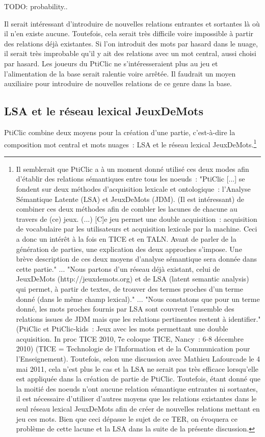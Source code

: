 \documentclass[a4paper,11pt,french]{article}
\begin{document}
TODO: probability..

Il serait intéressant d'introduire de nouvelles relations entrantes et sortantes là où il n'en existe aucune. Toutefois, cela serait très difficile voire impossible à partir des relations déjà existantes. Si l'on introduit des mots par hasard dans le nuage, il serait très improbable qu'il y ait des relations avec un mot central, aussi choisi par hasard. Les joueurs du PtiClic ne s'intéresseraient plus au jeu et l'alimentation de la base serait ralentie voire arrêtée. Il faudrait un moyen auxiliaire pour introduire de nouvelles relations de ce genre dans la base.  

\subsection{LSA et le réseau lexical JeuxDeMots}

PtiClic combine deux moyens pour la création d'une partie, c'est-à-dire la composition mot central et mots nuages~: LSA et le réseau lexical JeuxDeMots.\footnote{Il semblerait que PtiClic a à un moment donné utilisé ces deux modes afin d'établir des relations sémantiques entre tous les noeuds~: "PtiClic [...] se fondent sur deux méthodes d’acquisition lexicale et ontologique~: l'Analyse Sémantique Latente (LSA) et JeuxDeMots (JDM). (Il est intéressant) de combiner ces deux méthodes afin de combler les lacunes de chacune au travers de (ce) jeux. (...) [C]e jeu permet une double acquisition~: acquisition de vocabulaire par les utilisateurs et acquisition lexicale par la machine. Ceci a donc un intérêt à la fois en TICE et en TALN. Avant de parler de la génération de parties, une explication des deux approches s'impose. Une brève description de ces deux moyens d'analyse sémantique sera donnée dans cette partie." ... "Nous partons d’un réseau déjà existant, celui de JeuxDeMots (http://jeuxdemots.org) et de LSA (latent semantic analysis) qui permet, à partir de textes, de trouver des termes proches d’un terme donné (dans le même champ lexical)." ... "Nous constatons que pour un terme donné, les mots proches fournis par LSA sont couvrent l'ensemble des relations issues de JDM mais que les relations pertinentes restent à identifier." (PtiClic et PtiClic-kids~: Jeux avec les mots permettant une double acquisition. In proc TICE 2010, 7e coloque TICE, Nancy~: 6-8 décembre 2010) (TICE = Technologie de l'Information et de la Communication pour l'Enseignement). Toutefois, selon une discussion avec Mathieu Lafourcade le 4 mai 2011, cela n'est plus le cas et la LSA ne serait pas très efficace lorsqu'elle est appliquée dans la création de partie de PtiClic. Toutefois, étant donné que la moitié des noeuds n'ont aucune relation sémantique entrantes ni sortantes, il est nécessaire d'utiliser d'autres moyens que les relations existantes dans le seul réseau lexical JeuxDeMots afin de créer de nouvelles relations mettant en jeu ces mots. Bien que ceci dépasse le sujet de ce TER, on évoquera ce problème de cette lacune et la LSA dans la suite de la présente discussion.}
\end{document}

